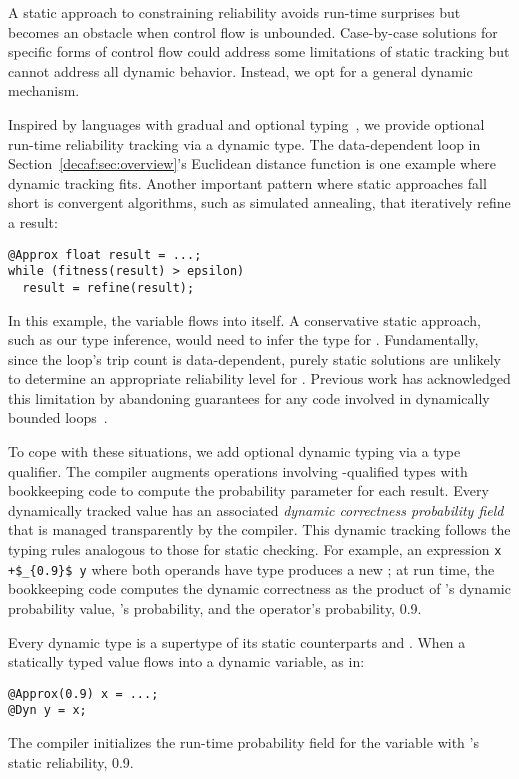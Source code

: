 A static approach to constraining reliability avoids run-time surprises but
becomes an obstacle when control flow is unbounded.
Case-by-case solutions for specific forms of control flow could address some
limitations of static tracking but cannot address all dynamic behavior.
Instead, we opt for a general dynamic mechanism.

Inspired by languages with gradual and optional typing~\cite{gradualfp},
we provide optional run-time reliability tracking via a dynamic type.
The data-dependent loop in Section~\ref{decaf:sec:overview}'s Euclidean
distance function is one example where dynamic tracking fits.
Another important pattern where static approaches fall short is convergent
algorithms, such as simulated annealing, that iteratively refine a result:
%
\begin{lstlisting}
@Approx float result = ...;
while (fitness(result) > epsilon)
  result = refine(result);
\end{lstlisting}
%
In this example, the  variable flows into itself.
A conservative static approach, such as our type inference, would need to infer
the type  for .
Fundamentally, since the loop's trip count is data-dependent, purely static
solutions are unlikely to determine an appropriate reliability level for
.
Previous work has acknowledged this limitation by abandoning guarantees for
any code involved in dynamically bounded loops~\cite{rely}.

To cope with these situations, we add optional dynamic typing via a
 type qualifier.
The compiler augments operations involving -qualified types with
bookkeeping code to compute the probability parameter for each result.
Every dynamically tracked value has an associated \emph{dynamic correctness
probability field} that is managed transparently by the compiler.
This dynamic tracking follows the typing rules analogous to those for static
checking.
For example, an expression \lstinline!x +$_{0.9}$ y! where both operands have type
 produces a new ; at run time, the
bookkeeping code computes the dynamic correctness as the product of 's
dynamic probability value, 's probability, and the operator's
probability, 0.9.

Every dynamic type  is a supertype of its static
counterparts  and .
When a statically typed value flows into a dynamic variable, as in:
%
\begin{lstlisting}
@Approx(0.9) x = ...;
@Dyn y = x;
\end{lstlisting}
%
The compiler initializes the run-time probability field for the variable
 with 's static reliability, 0.9.

